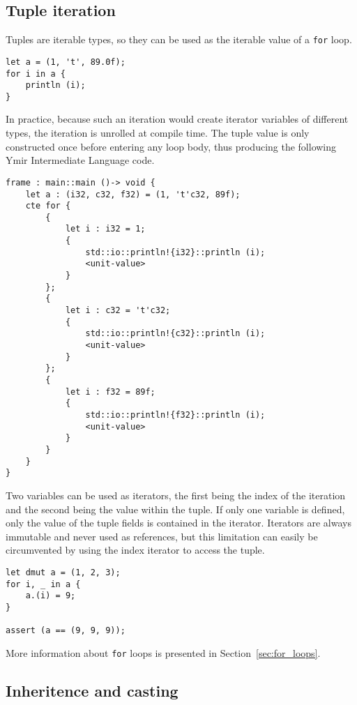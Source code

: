 \subsection {Tuple iteration}

Tuples are iterable types, so they can be used as the iterable value of a
\texttt{for} loop.

\begin{lstlisting}[style=coloredverbatim]
let a = (1, 't', 89.0f);
for i in a {
    println (i);
}
\end{lstlisting}

In practice, because such an iteration would create iterator variables of
different types, the iteration is unrolled at compile time. The tuple value is
only constructed once before entering any loop body, thus producing the
following Ymir Intermediate Language code.

\begin{lstlisting}[style=intermediateVerb]
frame : main::main ()-> void {
    let a : (i32, c32, f32) = (1, 't'c32, 89f);
    cte for {
        {
            let i : i32 = 1;
            {
                std::io::println!{i32}::println (i);
                <unit-value>
            }
        };
        {
            let i : c32 = 't'c32;
            {
                std::io::println!{c32}::println (i);
                <unit-value>
            }
        };
        {
            let i : f32 = 89f;
            {
                std::io::println!{f32}::println (i);
                <unit-value>
            }
        }
    }
}
\end{lstlisting}

Two variables can be used as iterators, the first being the index of the
iteration and the second being the value within the tuple. If only one variable
is defined, only the value of the tuple fields is contained in the iterator.
Iterators are always immutable and never used as references, but this limitation
can easily be circumvented by using the index iterator to access the tuple.
\pagebreak

\begin{lstlisting}[style=coloredverbatim]
let dmut a = (1, 2, 3);
for i, _ in a {
    a.(i) = 9;
}

assert (a == (9, 9, 9));
\end{lstlisting}

More information about \texttt{for} loops is presented in Section~\ref{sec:for_loops}.


\subsection {Inheritence and casting}

